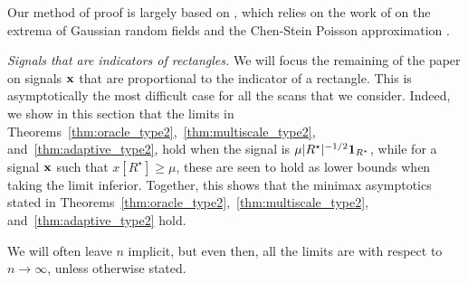 \documentclass[twoside,11pt]{article}
\begin{document}
Our method of proof is largely based on \citep{kabluchko2011extremes}, which relies on the work of \cite{chan2006maxima} on the extrema of Gaussian random fields and the Chen-Stein Poisson approximation \citep{arratia1989two}.

{\em Signals that are indicators of rectangles.}
We will focus the remaining of the paper on signals $\mathbf{x}$ that are proportional to the indicator of a rectangle.  This is asymptotically the most difficult case for all the scans that we consider.  Indeed, we show in this section that the limits in Theorems~\ref{thm:oracle_type2},~\ref{thm:multiscale_type2}, and~\ref{thm:adaptive_type2}, hold when the signal is $\mu |R^\star|^{-1/2} {\bf 1}_{R^\star}$, while for a signal $\mathbf{x}$ such that $x[R^\star] \ge \mu$, these are seen to hold as lower bounds when taking the limit inferior.  Together, this shows that the minimax asymptotics stated in Theorems~\ref{thm:oracle_type2},~\ref{thm:multiscale_type2}, and~\ref{thm:adaptive_type2} hold.

We will often leave $n$ implicit, but even then, all the limits are with respect to $n \to\infty$, unless otherwise stated.
\end{document}
